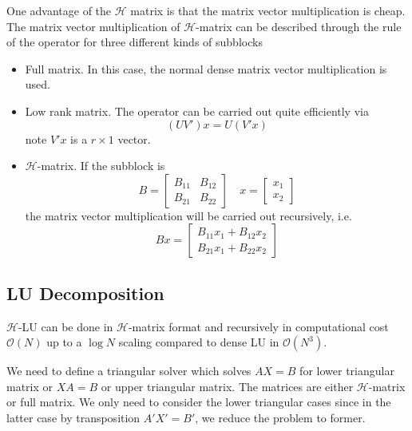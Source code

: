 \documentclass[10pt,a4paper]{article}
\theoremstyle{definition}
\begin{document}
One advantage of the $\mathcal{H}$ matrix is that the matrix vector multiplication is cheap. The matrix vector multiplication of $\mathcal{H}$-matrix can be described through the rule of the operator for three different kinds of subblocks
\begin{itemize}
	\item Full matrix. In this case, the normal dense matrix vector multiplication is used. 
	\item Low rank matrix. The operator can be carried out quite efficiently via
	\begin{equation}
		(UV')x = U(V'x)
	\end{equation}
	note $V'x$ is a $r\times 1$ vector.
	\item $\mathcal{H}$-matrix. If the subblock is 
	\begin{equation}
		B = \begin{bmatrix}
			B_{11}&B_{12}\\
			B_{21}&B_{22}
		\end{bmatrix}\quad x = \begin{bmatrix}
			x_1\\
			x_2
		\end{bmatrix}
	\end{equation}
	the matrix vector multiplication will be carried out recursively, i.e.
	\begin{equation}
		Bx = \begin{bmatrix}
			B_{11} x_1 + B_{12}x_2\\
			B_{21} x_1 + B_{22}x_2
		\end{bmatrix}
	\end{equation}
\end{itemize}





\subsection{LU Decomposition}

$\mathcal{H}$-LU can be done in $\mathcal{H}$-matrix format and recursively in computational cost $\mathcal{O}(N)$ up to a $\log N$ scaling compared to dense LU in $\mathcal{O}(N^3)$.


We need to define a triangular solver which solves $AX=B$ for lower triangular matrix or $XA = B$ or upper triangular matrix. The matrices are either $\mathcal{H}$-matrix or full matrix. We only need to consider the lower triangular cases since in the latter case by transposition $A'X'=B'$, we reduce the problem to former. 
\end{document}
